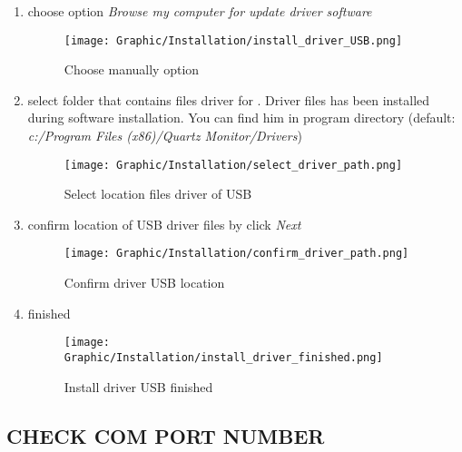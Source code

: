 \begin{enumerate}
\begin{enumerate}
\item choose option \textit{Browse my computer for update driver software}

		\begin{figure}[!h] 
		\centering \texttt{[image: Graphic/Installation/install\_driver\_USB.png]}	
		\caption{Choose manually option}
		\label{choose_manually_option}
		\end{figure}
		\FloatBarrier

\item select folder that contains files driver for \deviceName. Driver files has been installed during software installation. You can find him in program directory (default: \\ \textit{c:/Program Files (x86)/Quartz Monitor/Drivers})

	\begin{figure}[!h] 
		\centering \texttt{[image: Graphic/Installation/select\_driver\_path.png]}	
		\caption{Select location files driver of USB}
		\label{select_driver_USB_location}
		\end{figure}
		\FloatBarrier

\item confirm location of USB driver files by click \textit{Next}

	\begin{figure}[!h] 
		\centering \texttt{[image: Graphic/Installation/confirm\_driver\_path.png]}	
		\caption{Confirm driver USB location}
		\label{confirm_driver_USB_location}
		\end{figure}
		\FloatBarrier


\item finished

	\begin{figure}[!h] 
		\centering \texttt{[image: Graphic/Installation/install\_driver\_finished.png]}	
		\caption{Install driver USB finished}
		\label{install_driver_USB_finished}
		\end{figure}
		\FloatBarrier

	\end{enumerate}

\end{enumerate}

\subsection {CHECK COM PORT NUMBER} \label{check_port_com}

